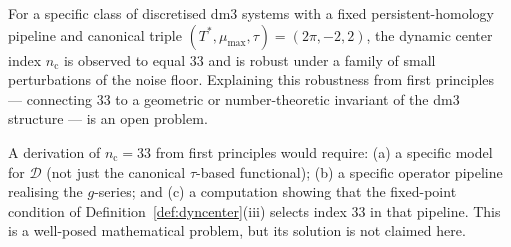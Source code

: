 \begin{conjecture}
\label{conj:33}
For a specific class of discretised dm3 systems with a fixed
persistent-homology pipeline and canonical triple
$(T^*, \mu_{\max}, \tau) = (2\pi, -2, 2)$, the dynamic center index
$n_{\mathrm{c}}$ is observed to equal $33$ and is robust under a
family of small perturbations of the noise floor. Explaining this
robustness from first principles — connecting $33$ to a geometric
or number-theoretic invariant of the dm3 structure — is an open
problem.
\end{conjecture}

\begin{remark}
A derivation of $n_{\mathrm{c}} = 33$ from first principles would
require: (a) a specific model for $\mathcal{D}$ (not just the
canonical $\tau$-based functional); (b) a specific operator pipeline
realising the $g$-series; and (c) a computation showing that the
fixed-point condition of Definition~\ref{def:dyncenter}(iii) selects
index $33$ in that pipeline. This is a well-posed mathematical problem,
but its solution is not claimed here.
\end{remark}

